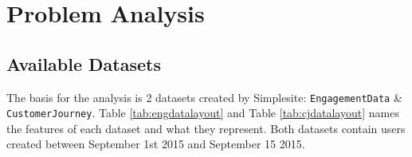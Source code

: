 \section{Problem Analysis}


\subsection{Available Datasets}

The basis for the analysis is 2 datasets created by Simplesite:
\texttt{EngagementData} \& \texttt{CustomerJourney}. Table
\ref{tab:engdatalayout} and Table \ref{tab:cjdatalayout} names the features of
each dataset and what they represent. Both datasets contain users created
between September 1st 2015 and September 15 2015. 


